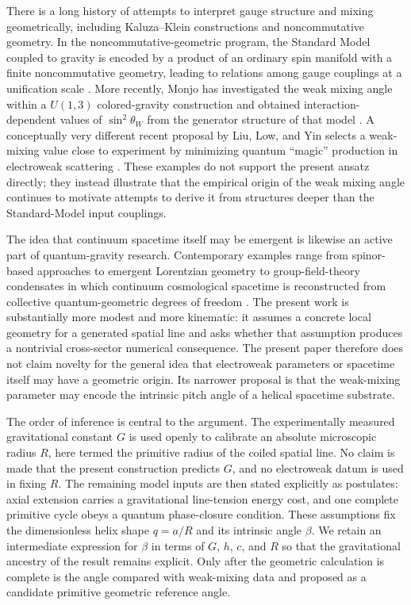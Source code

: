 \documentclass[aps,prd,reprint,nofootinbib,floatfix]{revtex4-2}
\begin{document}
There is a long history of attempts to interpret gauge structure and mixing geometrically, including Kaluza--Klein constructions and noncommutative geometry.  In the noncommutative-geometric program, the Standard Model coupled to gravity is encoded by a product of an ordinary spin manifold with a finite noncommutative geometry, leading to relations among gauge couplings at a unification scale \cite{Connes2006,ChamseddineConnesMarcolli2006}.  More recently, Monjo has investigated the weak mixing angle within a $U(1,3)$ colored-gravity construction and obtained interaction-dependent values of $\sin^2\theta_W$ from the generator structure of that model \cite{Monjo2025}.  A conceptually very different recent proposal by Liu, Low, and Yin selects a weak-mixing value close to experiment by minimizing quantum ``magic'' production in electroweak scattering \cite{LiuLowYin2025}.  These examples do not support the present ansatz directly; they instead illustrate that the empirical origin of the weak mixing angle continues to motivate attempts to derive it from structures deeper than the Standard-Model input couplings.

The idea that continuum spacetime itself may be emergent is likewise an active part of quantum-gravity research.  Contemporary examples range from spinor-based approaches to emergent Lorentzian geometry \cite{Rainer2026} to group-field-theory condensates in which continuum cosmological spacetime is reconstructed from collective quantum-geometric degrees of freedom \cite{CalcinariDelhomOriti2026,DekhilGrecoLiberatiOriti2026}.  The present work is substantially more modest and more kinematic: it assumes a concrete local geometry for a generated spatial line and asks whether that assumption produces a nontrivial cross-sector numerical consequence.  The present paper therefore does not claim novelty for the general idea that electroweak parameters or spacetime itself may have a geometric origin.  Its narrower proposal is that the weak-mixing parameter may encode the intrinsic pitch angle of a helical spacetime substrate.

The order of inference is central to the argument.  The experimentally measured gravitational constant $G$ is used openly to calibrate an absolute microscopic radius $R$, here termed the primitive radius of the coiled spatial line.  No claim is made that the present construction predicts $G$, and no electroweak datum is used in fixing $R$.  The remaining model inputs are then stated explicitly as postulates: axial extension carries a gravitational line-tension energy cost, and one complete primitive cycle obeys a quantum phase-closure condition.  These assumptions fix the dimensionless helix shape $q=a/R$ and its intrinsic angle $\beta$.  We retain an intermediate expression for $\beta$ in terms of $G$, $h$, $c$, and $R$ so that the gravitational ancestry of the result remains explicit.  Only after the geometric calculation is complete is the angle compared with weak-mixing data and proposed as a candidate primitive geometric reference angle.
\end{document}
